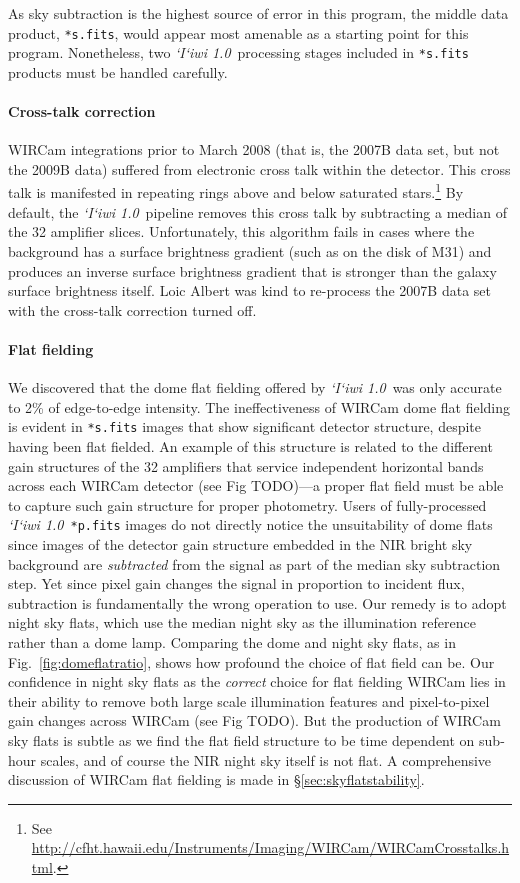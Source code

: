 \documentclass[iop]{emulateapj}
\newcommand{\sw}[1]{\textit{#1}} %
\newcommand{\iiwione}{\sw{`I`iwi 1.0}}
\newcommand{\todo}[1]{\textcolor{RedOrange}{#1}} %
\newcommand{\Fig}[1]{Fig.~\ref{fig:#1}}  %
\newcommand{\Sec}[1]{\S\ref{sec:#1}}  %
\begin{document}
As sky subtraction is the highest source of error in this program, the middle data product, \texttt{*s.fits}, would appear most amenable as a starting point for this program.
Nonetheless, two \iiwione\ processing stages included in \texttt{*s.fits} products must be handled carefully.

\paragraph{Cross-talk correction} WIRCam integrations prior to March 2008 (that is, the 2007B data set, but not the 2009B data) suffered from electronic cross talk within the detector.
This cross talk is manifested in repeating rings above and below saturated stars.\footnote{See \url{http://cfht.hawaii.edu/Instruments/Imaging/WIRCam/WIRCamCrosstalks.html}.}
By default, the \iiwione\ pipeline removes this cross talk by subtracting a median of the 32 amplifier slices.
Unfortunately, this algorithm fails in cases where the background has a surface brightness gradient (such as on the disk of M31) and produces an inverse surface brightness gradient that is stronger than the galaxy surface brightness itself.
Loic Albert was kind to re-process the 2007B data set with the cross-talk correction turned off.

\paragraph{Flat fielding} We discovered that the dome flat fielding offered by \iiwione\ was only accurate to 2\% of edge-to-edge intensity.
The ineffectiveness of WIRCam dome flat fielding is evident in \texttt{*s.fits} images that show significant detector structure, despite having been flat fielded.
An example of this structure is related to the different gain structures of the 32 amplifiers that service independent horizontal bands across each WIRCam detector (see Fig \todo{TODO})---a proper flat field must be able to capture such gain structure for proper photometry.
Users of fully-processed \iiwione\ \texttt{*p.fits} images do not directly notice the unsuitability of dome flats since images of the detector gain structure embedded in the NIR bright sky background are \textit{subtracted} from the signal as part of the median sky subtraction step.
Yet since pixel gain changes the signal in proportion to incident flux, subtraction is fundamentally the wrong operation to use.
Our remedy is to adopt night sky flats, which use the median night sky as the illumination reference rather than a dome lamp.
Comparing the dome and night sky flats, as in \Fig{domeflatratio}, shows how profound the choice of flat field can be.
Our confidence in night sky flats as the \textit{correct} choice for flat fielding WIRCam lies in their ability to remove both large scale illumination features and pixel-to-pixel gain changes across WIRCam (see Fig \todo{TODO}).
But the production of WIRCam sky flats is subtle as we find the flat field structure to be time dependent on sub-hour scales, and of course the NIR night sky itself is not flat.
A comprehensive discussion of WIRCam flat fielding is made in \Sec{skyflatstability}.
\end{document}
